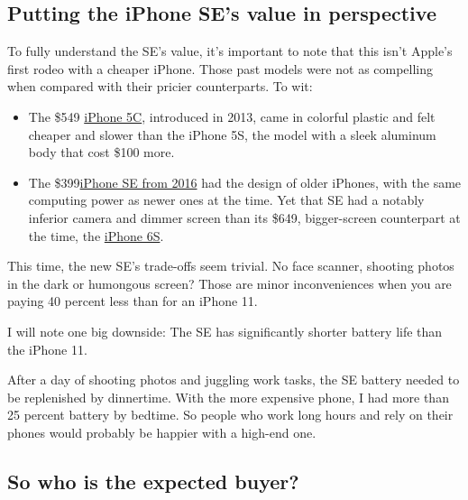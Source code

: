 \hypertarget{putting-the-iphone-ses-value-in-perspective}{%
\subsection{Putting the iPhone SE's value in
perspective}\label{putting-the-iphone-ses-value-in-perspective}}

To fully understand the SE's value, it's important to note that this
isn't Apple's first rodeo with a cheaper iPhone. Those past models were
not as compelling when compared with their pricier counterparts. To wit:

\begin{itemize}
\item
  The \$549
  \href{https://www.nytimes3xbfgragh.onion/2013/09/11/technology/apple-shows-off-2-new-iphones-one-a-lower-cost-model.html}{iPhone
  5C}, introduced in 2013, came in colorful plastic and felt cheaper and
  slower than the iPhone 5S, the model with a sleek aluminum body that
  cost \$100 more.
\item
  The
  \$399\href{https://www.nytimes3xbfgragh.onion/2016/03/24/technology/personaltech/who-will-like-the-new-smaller-iphone-se.html}{iPhone
  SE from 2016} had the design of older iPhones, with the same computing
  power as newer ones at the time. Yet that SE had a notably inferior
  camera and dimmer screen than its \$649, bigger-screen counterpart at
  the time, the
  \href{https://www.nytimes3xbfgragh.onion/2015/09/24/technology/personaltech/testing-iphone-6s-3d-touch-and-live-photos-features.html?mtrref=www.nytimes3xbfgragh.onion\&gwh=C46D33577D43FB58BDB34B5FA60A3C9E\&gwt=pay\&_r=0}{iPhone
  6S}.
\end{itemize}

This time, the new SE's trade-offs seem trivial. No face scanner,
shooting photos in the dark or humongous screen? Those are minor
inconveniences when you are paying 40 percent less than for an iPhone
11.

I will note one big downside: The SE has significantly shorter battery
life than the iPhone 11.

After a day of shooting photos and juggling work tasks, the SE battery
needed to be replenished by dinnertime. With the more expensive phone, I
had more than 25 percent battery by bedtime. So people who work long
hours and rely on their phones would probably be happier with a high-end
one.

\hypertarget{so-who-is-the-expected-buyer}{%
\subsection{So who is the expected
buyer?}\label{so-who-is-the-expected-buyer}}

